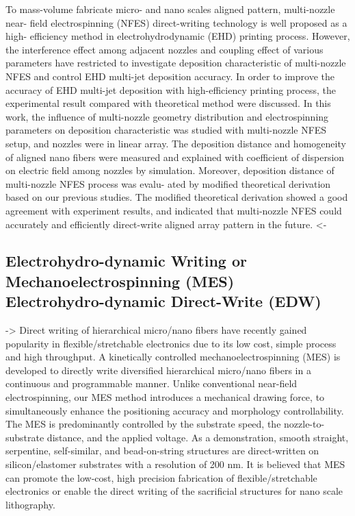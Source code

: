 \documentclass[5p,,preprint,12pt,twocolumn]{elsarticle}
\begin{document}
To mass-volume fabricate micro- and nano scales aligned pattern, multi-nozzle near- field electrospinning (NFES) direct-writing technology is well proposed as a high- efficiency method in electrohydrodynamic (EHD) printing process. However, the interference effect among adjacent nozzles and coupling effect of various parameters have restricted to investigate deposition characteristic of multi-nozzle NFES and control EHD multi-jet deposition accuracy. In order to improve the accuracy of EHD multi-jet deposition with high-efficiency printing process, the experimental result compared with theoretical method were discussed. In this work, the influence of multi-nozzle geometry distribution and electrospinning parameters on deposition characteristic was studied with multi-nozzle NFES setup, and nozzles were in linear array. The deposition distance and homogeneity of aligned nano fibers were measured and explained with coefficient of dispersion on electric field among nozzles by simulation. Moreover, deposition distance of multi-nozzle NFES process was evalu- ated by modified theoretical derivation based on our previous studies. The modified theoretical derivation showed a good agreement with experiment results, and indicated that multi-nozzle NFES could accurately and efficiently direct-write aligned array pattern in the future. {\textless}-



\subsection{Electrohydro-dynamic Writing or Mechanoelectrospinning (MES) \unskip~\protect\cite{527120:11974311} \mbox{}\protect\newline Electrohydro-dynamic Direct-Write (EDW) \unskip~\protect\cite{527120:11974328}}-{\textgreater} Direct writing of hierarchical micro/nano fibers have recently gained popularity in flexible/stretchable electronics due to its low cost, simple process and high throughput. A kinetically controlled mechanoelectrospinning (MES) is developed to directly write diversified hierarchical micro/nano fibers in a continuous and programmable manner. Unlike conventional near-field electrospinning, our MES method introduces a mechanical drawing force, to simultaneously enhance the positioning accuracy and morphology controllability. The MES is predominantly controlled by the substrate speed, the nozzle-to-substrate distance, and the applied voltage. As a demonstration, smooth straight, serpentine, self-similar, and bead-on-string structures are direct-written on silicon/elastomer substrates with a resolution of 200 nm. It is believed that MES can promote the low-cost, high precision fabrication of flexible/stretchable electronics or enable the direct writing of the sacrificial structures for nano scale lithography.
\end{document}
